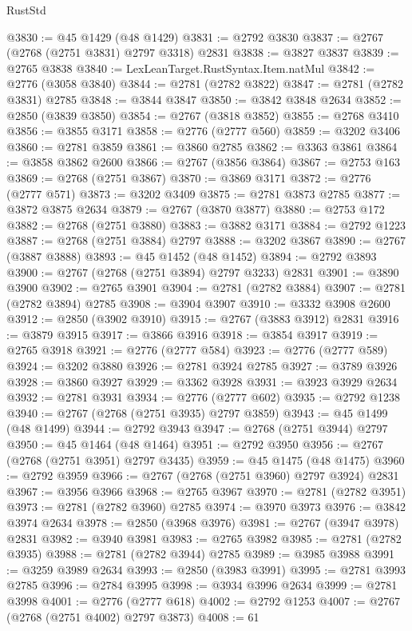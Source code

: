\begin{lexlean}{RustStd}
\begin{coremodule}
@3830 := @45 @1429 (@48 @1429)
@3831 := @2792 @3830
@3837 := @2767 (@2768 (@2751 @3831) @2797 @3318) @2831
@3838 := @3827 @3837
@3839 := @2765 @3838
@3840 := LexLeanTarget.RustSyntax.Item.natMul
@3842 := @2776 (@3058 @3840)
@3844 := @2781 (@2782 @3822)
@3847 := @2781 (@2782 @3831) @2785
@3848 := @3844 @3847
@3850 := @3842 @3848 @2634
@3852 := @2850 (@3839 @3850)
@3854 := @2767 (@3818 @3852)
@3855 := @2768 @3410
@3856 := @3855 @3171
@3858 := @2776 (@2777 @560)
@3859 := @3202 @3406
@3860 := @2781 @3859
@3861 := @3860 @2785
@3862 := @3363 @3861
@3864 := @3858 @3862 @2600
@3866 := @2767 (@3856 @3864)
@3867 := @2753 @163
@3869 := @2768 (@2751 @3867)
@3870 := @3869 @3171
@3872 := @2776 (@2777 @571)
@3873 := @3202 @3409
@3875 := @2781 @3873 @2785
@3877 := @3872 @3875 @2634
@3879 := @2767 (@3870 @3877)
@3880 := @2753 @172
@3882 := @2768 (@2751 @3880)
@3883 := @3882 @3171
@3884 := @2792 @1223
@3887 := @2768 (@2751 @3884) @2797
@3888 := @3202 @3867
@3890 := @2767 (@3887 @3888)
@3893 := @45 @1452 (@48 @1452)
@3894 := @2792 @3893
@3900 := @2767 (@2768 (@2751 @3894) @2797 @3233) @2831
@3901 := @3890 @3900
@3902 := @2765 @3901
@3904 := @2781 (@2782 @3884)
@3907 := @2781 (@2782 @3894) @2785
@3908 := @3904 @3907
@3910 := @3332 @3908 @2600
@3912 := @2850 (@3902 @3910)
@3915 := @2767 (@3883 @3912) @2831
@3916 := @3879 @3915
@3917 := @3866 @3916
@3918 := @3854 @3917
@3919 := @2765 @3918
@3921 := @2776 (@2777 @584)
@3923 := @2776 (@2777 @589)
@3924 := @3202 @3880
@3926 := @2781 @3924 @2785
@3927 := @3789 @3926
@3928 := @3860 @3927
@3929 := @3362 @3928
@3931 := @3923 @3929 @2634
@3932 := @2781 @3931
@3934 := @2776 (@2777 @602)
@3935 := @2792 @1238
@3940 := @2767 (@2768 (@2751 @3935) @2797 @3859)
@3943 := @45 @1499 (@48 @1499)
@3944 := @2792 @3943
@3947 := @2768 (@2751 @3944) @2797
@3950 := @45 @1464 (@48 @1464)
@3951 := @2792 @3950
@3956 := @2767 (@2768 (@2751 @3951) @2797 @3435)
@3959 := @45 @1475 (@48 @1475)
@3960 := @2792 @3959
@3966 := @2767 (@2768 (@2751 @3960) @2797 @3924) @2831
@3967 := @3956 @3966
@3968 := @2765 @3967
@3970 := @2781 (@2782 @3951)
@3973 := @2781 (@2782 @3960) @2785
@3974 := @3970 @3973
@3976 := @3842 @3974 @2634
@3978 := @2850 (@3968 @3976)
@3981 := @2767 (@3947 @3978) @2831
@3982 := @3940 @3981
@3983 := @2765 @3982
@3985 := @2781 (@2782 @3935)
@3988 := @2781 (@2782 @3944) @2785
@3989 := @3985 @3988
@3991 := @3259 @3989 @2634
@3993 := @2850 (@3983 @3991)
@3995 := @2781 @3993 @2785
@3996 := @2784 @3995
@3998 := @3934 @3996 @2634
@3999 := @2781 @3998
@4001 := @2776 (@2777 @618)
@4002 := @2792 @1253
@4007 := @2767 (@2768 (@2751 @4002) @2797 @3873)
@4008 := 61

\end{coremodule}
\end{lexlean}
